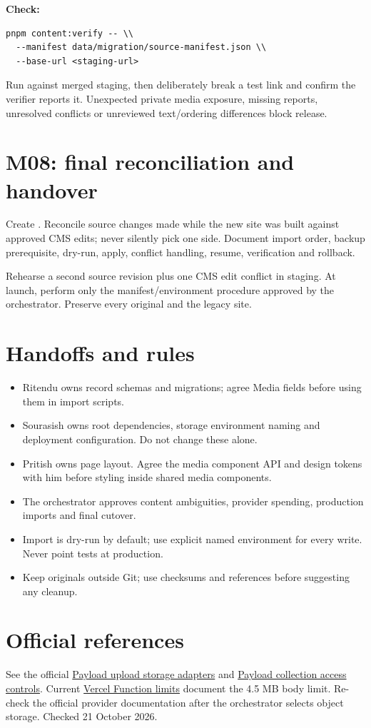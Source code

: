 \documentclass[11pt]{article}
\newcommand{\pathfile}[1]{\path{#1}}
\begin{document}
\textbf{Check:}
\begin{verbatim}
pnpm content:verify -- \\
  --manifest data/migration/source-manifest.json \\
  --base-url <staging-url>
\end{verbatim}
Run against merged staging, then deliberately break a test link and confirm the verifier reports it. Unexpected private media exposure, missing reports, unresolved conflicts or unreviewed text/ordering differences block release.

\section{M08: final reconciliation and handover}
Create \pathfile{docs/content-migration-runbook.md}. Reconcile source changes made while the new site was built against approved CMS edits; never silently pick one side. Document import order, backup prerequisite, dry-run, apply, conflict handling, resume, verification and rollback.

Rehearse a second source revision plus one CMS edit conflict in staging. At launch, perform only the manifest/environment procedure approved by the orchestrator. Preserve every original and the legacy site.

\section{Handoffs and rules}
\begin{itemize}
\item Ritendu owns record schemas and migrations; agree Media fields before using them in import scripts.
\item Sourasish owns root dependencies, storage environment naming and deployment configuration. Do not change these alone.
\item Pritish owns page layout. Agree the media component API and design tokens with him before styling inside shared media components.
\item The orchestrator approves content ambiguities, provider spending, production imports and final cutover.
\item Import is dry-run by default; use explicit named environment for every write. Never point tests at production.
\item Keep originals outside Git; use checksums and references before suggesting any cleanup.
\end{itemize}

\section{Official references}
See the official \href{https://payloadcms.com/docs/upload/storage-adapters}{Payload upload storage adapters} and \href{https://payloadcms.com/docs/access-control/overview}{Payload collection access controls}. Current \href{https://vercel.com/docs/functions/limitations}{Vercel Function limits} document the 4.5 MB body limit. Re-check the official provider documentation after the orchestrator selects object storage. Checked 21 October 2026.
\end{document}
